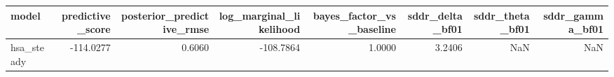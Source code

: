 \begin{tabular}{lrrrrrrr}
\toprule
model & predictive\_score & posterior\_predictive\_rmse & log\_marginal\_likelihood & bayes\_factor\_vs\_baseline & sddr\_delta\_bf01 & sddr\_theta\_bf01 & sddr\_gamma\_bf01 \\
\midrule
hsa\_steady & -114.0277 & 0.6060 & -108.7864 & 1.0000 & 3.2406 & NaN & NaN \\
\bottomrule
\end{tabular}
